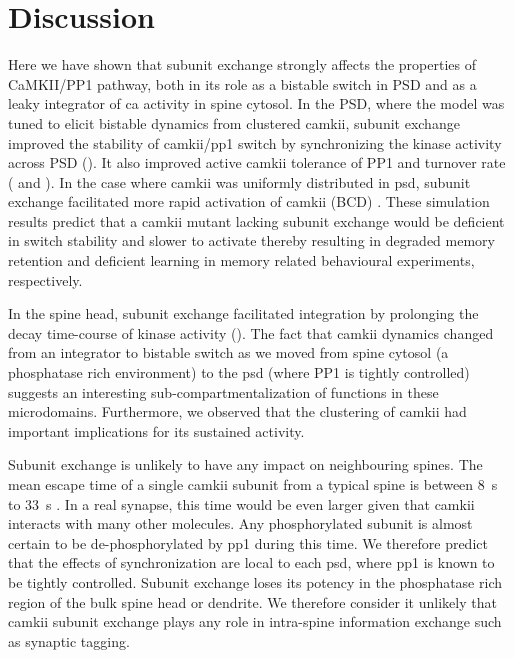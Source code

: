 \documentclass[9pt,lineno]{elife}
\begin{document}
\section{Discussion}\label{discussion}

Here we have shown that subunit exchange strongly affects the properties of
CaMKII/PP1 pathway, both in its role as a bistable switch in PSD and as a leaky
integrator of \gls{ca} activity in spine cytosol. In the PSD, where the model
was tuned to elicit bistable dynamics from clustered \gls{camkii}, subunit
exchange improved the stability of \gls{camkii}/\gls{pp1} switch by
synchronizing the kinase activity across PSD (). It also
improved active \gls{camkii} tolerance of PP1 and turnover rate
( and ). In the case where \gls{camkii} was
uniformly distributed in \gls{psd}, subunit exchange facilitated more rapid
activation of \gls{camkii} (BCD)
\citep{stratton_activation-triggered_2014}. These simulation results predict
that a \gls{camkii} mutant lacking subunit exchange would be deficient in switch
stability and slower to activate thereby resulting in degraded memory retention
and deficient learning in memory related behavioural experiments, respectively.

In the spine head, subunit exchange facilitated integration by prolonging the
decay time-course of kinase activity ().  The fact that
\gls{camkii} dynamics changed from an integrator to bistable switch as we moved
from spine cytosol (a phosphatase rich environment) to the \gls{psd} (where PP1
is tightly controlled) suggests an interesting sub-compartmentalization of
functions in these microdomains. Furthermore, we observed that the clustering of
\gls{camkii} had important implications for its sustained activity.

Subunit exchange is unlikely to have any impact on neighbouring spines. The mean
escape time of a single \gls{camkii} subunit from a typical spine is between
\SI{8}{\second} to \SI{33}{\second} \citep{holcman_diffusion_2011}. In a real
synapse, this time would be even larger given that \gls{camkii} interacts with
many other molecules. Any phosphorylated subunit is almost certain to be
de-phosphorylated by \gls{pp1} during this time. We therefore predict that the
effects of synchronization are local to each \gls{psd}, where \gls{pp1} is known
to be tightly controlled.  Subunit exchange loses its potency in the phosphatase
rich region of the bulk spine head or dendrite. We therefore consider it
unlikely that \gls{camkii} subunit exchange plays any role in intra-spine
information exchange such as synaptic tagging.
\end{document}
